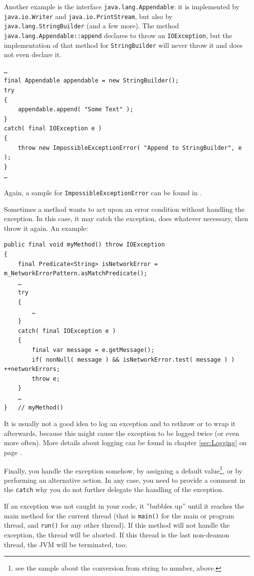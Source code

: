 \documentclass[11pt,a4paper, titlepage, parskip=half, headsepline, footsepline, cleardoublepage=current, headheight=1cm]{scrbook}
\newcommand*{\tqvref}[1]{\hyperref[{#1}]{\ref*{#1}} on page \pageref{#1}}
\begin{document}
Another example is the interface \lstinline|java.lang.Appendable|\autocite{ORACLE_DOC_APPENDABLE_INTERFACE}: it is implemented by \lstinline|java.io.Writer| and \lstinline|java.io.PrintStream|, but also by \lstinline|java.lang.StringBuilder| (and a few more). The method \lstinline|java.lang.Appendable::append| declares to throw an \lstinline|IOException|, but the implementation of that method for \lstinline|StringBuilder| will never throw it and does not even declare it.
\begin{lstlisting}
…
final Appendable appendable = new StringBuilder();
try
{
    appendable.append( "Some Text" );
}
catch( final IOException e )
{
    throw new ImpossibleExceptionError( "Append to StringBuilder", e );
}
…
\end{lstlisting}

Again, a sample for \lstinline|ImpossibleExceptionError| can be found in \autocite{TQUADRAT_ORG_FOUNDATION_IMPOSSIBLEEXCEPTIONERROR}.

Sometimes a method wants to act upon an error condition without handling the exception. In this case, it may catch the exception, does whatever necessary, then throw it again. An example:
\begin{lstlisting}
public final void myMethod() throw IOException
{
    final Predicate<String> isNetworkError = m_NetworkErrorPattern.asMatchPredicate();
    …
    try
    {
        …
    }
    catch( final IOException e )
    {
        final var message = e.getMessage();
        if( nonNull( message ) && isNetworkError.test( message ) ) ++networkErrors;
        throw e;
    }
    …
}   // myMethod()
\end{lstlisting}

It is usually not a good idea to log an exception and to rethrow or to wrap it afterwards, because this might cause the exception to be logged twice (or even more often). More details about logging can be found in chapter \tqvref{sec:Logging}.

Finally, you handle the exception somehow, by assigning a default value\footnote{see the sample about the conversion from string to number, above.}, or by performing an alternative action. In any case, you need to provide a comment in the \lstinline|catch| why you do not further delegate the handling of the exception.

If an exception was not caught in your code, it ”bubbles up” until it reaches the main method for the current thread (that is \lstinline|main()| for the main or program thread, and \lstinline|run()|\autocite{ORACLE_DOC_RUNNABLE:run} for any other thread). If this method will not handle the exception, the thread will be aborted. If this thread is the last non-deamon thread, the JVM will be terminated, too.
\end{document}
